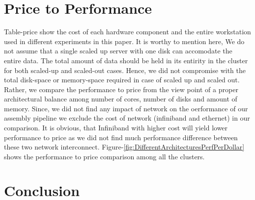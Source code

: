 \documentclass[conference]{IEEEtran}
\begin{document}

\section {Price to Performance} \label{PriceToPerformance}
Table-price show the cost of each hardware component and the entire workstation used in different experiments in this paper.
It is worthy to mention here, We do not assume that a single scaled up server with one disk can accomodate the entire data.
The total amount of data should be held in its entirity in the cluster for both scaled-up and scaled-out cases.
Hence, we did not compromise with the total disk-space or memory-space required in case of scaled up and scaled out.
Rather, we compare the performance to price from the view point of a proper architectural balance among number of cores, number of disks and amount of memory.
Since, we did not find any impact of network on the oerformance of our assembly pipeline we exclude the cost of network (infiniband and ethernet) in our comparison. It is obvious, that Infiniband with higher cost will yield lower performance to price as we did not find much performance difference between these two network interconnect. 
Figure-\ref{fig:DifferentArchitecturesPerfPerDollar} shows the performance to price comparison among all the clusters.

\section {Conclusion}
\end{document}
